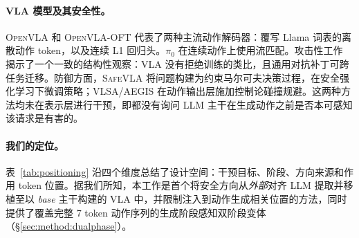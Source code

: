 \paragraph{VLA 模型及其安全性。}
\textsc{OpenVLA} \cite{openvla2024} 和 \textsc{OpenVLA-OFT} \cite{openvlaoft2025} 代表了两种主流动作解码器：覆写 Llama 词表的离散动作 token，以及连续 L1 回归头。\textsc{$\pi_0$} \cite{pi02024} 在连续动作上使用流匹配。攻击性工作 \cite{wu2024exploringadversarial,badrobot2025,shawshank2025} 揭示了一个一致的结构性观察：VLA 没有拒绝训练的类比，且通用对抗补丁可跨任务迁移。防御方面，\textsc{SafeVLA} \cite{safevla2025} 将问题构建为约束马尔可夫决策过程，在安全强化学习下微调策略；\textsc{VLSA}/\textsc{AEGIS} \cite{vlsa2025} 在动作输出层施加控制论碰撞规避。这两种方法均未在表示层进行干预，即都没有询问 LLM 主干在生成动作之前是否本可感知该请求是有害的。

\paragraph{我们的定位。}
表~\ref{tab:positioning} 沿四个维度总结了设计空间：干预目标、阶段、方向来源和作用 token 位置。据我们所知，本工作是首个将安全方向从\emph{外部}对齐 LLM 提取并移植至以 \emph{base} 主干构建的 VLA 中，并限制注入到动作生成相关位置的方法，同时提供了覆盖完整 7 token 动作序列的生成阶段感知双阶段变体（\S\ref{sec:method:dualphase}）。


